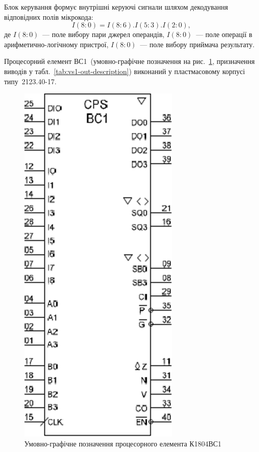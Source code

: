 \documentclass[a4paper,oneside,DIV=12,12pt,headings=normal]{scrartcl}
\begin{document}
				Блок керування формує внутрішні керуючі сигнали шляхом декодування відповідних полів мікрокода:
				\begin{equation*}
					I(8{:}0) = I(8{:}6).I(5{:}3).I(2{:}0),
				\end{equation*}
				де $I(8{:}0)$~— поле вибору пари джерел операндів, $I(8{:}0)$~— поле операції в ариф\-ме\-тич\-но-логіч\-но\-му пристрої, $I(8{:}0)$~— поле вибору приймача результату.

				Процесорний елемент ВС1~(умовно-графічне позначення на рис.~\ref{fig:vs1-mark}, призначення виводів у табл.~\ref{tab:vs1-out-description}) виконаний у пластмасовому корпусі типу~2123.40-17.
				\begin{figure}[!htbp]
					\centering
					\includegraphics[height = 13\baselineskip]{./assets/02-vs1-mark.png}
					\caption{Умовно-графічне позначення процесорного елемента К1804ВС1}
					\label{fig:vs1-mark}
				\end{figure}
\end{document}
